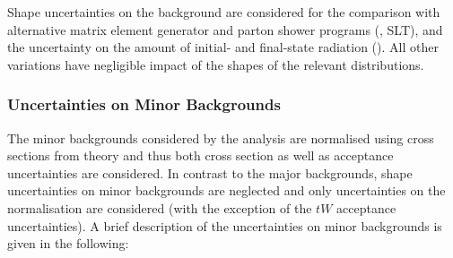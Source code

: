 Shape uncertainties on the \ttbar background are considered for the
comparison with alternative matrix element generator and parton shower
programs (\hadhad, \lephad SLT), and the uncertainty on the amount of
initial- and final-state radiation (\hadhad). All other variations
have negligible impact of the shapes of the relevant distributions.


\subsubsection{Uncertainties on Minor Backgrounds}

The minor backgrounds considered by the analysis are normalised using
cross sections from theory and thus both cross section as well as
acceptance uncertainties are considered. In contrast to the major
backgrounds, shape uncertainties on minor backgrounds are neglected
and only uncertainties on the normalisation are considered (with the
exception of the $tW$ acceptance uncertainties).  A brief description
of the uncertainties on minor backgrounds is given in the following:
